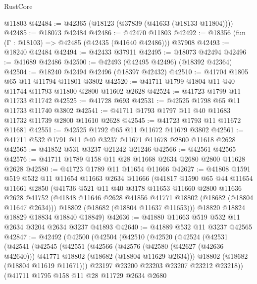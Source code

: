 \begin{lexlean}{RustCore}
\begin{coremodule}
    @11803
@42484 := @42365 (@18123 (@37839 (@41633 (@18133 @11804))))
@42485 := @18073 @42484
@42486 := @42470 @11803
@42492 := @18356 (fun (Γ : @18103) => @42485 (@42435 (@41640 @42486))) @37908
@42493 := @18240 @42484
@42494 := @42433 @37911
@42495 := @18073 @42494
@42496 := @41689 @42486
@42500 := @42493 (@42495 @42496) (@18392 @42364)
@42504 := @18240 @42494 @42496 (@18397 @42432)
@42510 := @41704 @1805 @65 @11 @11794 @11801 @3802
@42520 := @41711 @1799 @1804 @11 @40 @11744 @11793 @11800 @2800 @11602 @2628
@42524 := @41723 @1799 @11 @11733 @11742
@42525 := @41728 @693
@42531 := @42525 @1798 @65 @11 @11733 @11740 @3802
@42541 := @41711 @1793 @1797 @11 @40 @11683 @11732 @11739 @2800 @11610 @2628
@42545 := @41723 @1793 @11 @11672 @11681
@42551 := @42525 @1792 @65 @11 @11672 @11679 @3802
@42561 := @41711 @532 @1791 @11 @40 @3237 @11671 @11678 @2800 @11618 @2628
@42565 := @41852 @531 @3237 @21242 @21246
@42566 := @42561 @42565
@42576 := @41711 @1789 @158 @11 @28 @11668 @2634 @2680 @2800 @11628 @2628
@42580 := @41723 @1789 @11 @11654 @11666
@42627 := @41808
    @1591
    @519
    @532
    @11
    @11654
    @11663
    @2634
    @11666
    (@41817
      @1590
      @65
      @44
      @11654
      @11661
      @2850
      (@41736
        @521
        @11
        @40
        @3178
        @11653
        @11660
        @2800
        @11636
        @2628
        @41752
        (@41848 @11646 @2628 @41856 @41771 @18802 (@18682 (@18804 @11647 @2634)))
        @18802
        (@18682 (@18804 @11637 @11653)))
      @18820
      @18824
      @18829
      @18834
      @18840
      @18849)
@42636 := @41880 @11663 @519 @532 @11 @2634 @3204 @2634 @3237 @41893
@42640 := @41889 @532 @11 @3237 @42565
@42847 := @42492
    (@42500
      (@42504
        (@42510
          (@42520
            (@42524
              (@42531
                (@42541
                  (@42545
                    (@42551
                      (@42566
                        (@42576
                          (@42580 (@42627 (@42636 @42640)))
                          @41771
                          @18802
                          (@18682 (@18804 @11629 @2634)))
                        @18802
                        (@18682 (@18804 @11619 @11671)))
                      @23197
                      @23200
                      @23203
                      @23207
                      @23212
                      @23218))
                  (@41711
                    @1795
                    @158
                    @11
                    @28
                    @11729
                    @2634
                    @2680

\end{coremodule}
\end{lexlean}
